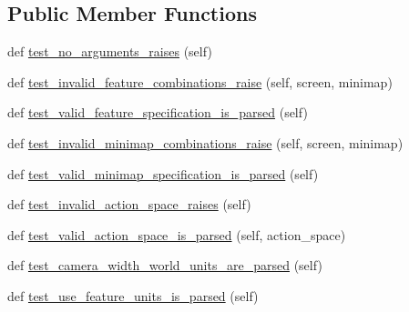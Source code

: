 \subsection*{Public Member Functions}
\begin{DoxyCompactItemize}
\item 
def \mbox{\hyperlink{classpysc2_1_1lib_1_1features__test_1_1_test_parse_agent_interface_format_ab7e830cda6ac5cd5b2b7df2de3d3d987}{test\+\_\+no\+\_\+arguments\+\_\+raises}} (self)
\item 
def \mbox{\hyperlink{classpysc2_1_1lib_1_1features__test_1_1_test_parse_agent_interface_format_a0aac626ffc7c5f1395a73e044b2cbbfe}{test\+\_\+invalid\+\_\+feature\+\_\+combinations\+\_\+raise}} (self, screen, minimap)
\item 
def \mbox{\hyperlink{classpysc2_1_1lib_1_1features__test_1_1_test_parse_agent_interface_format_a0b68ba647c6054b50fce7db1aa1510bf}{test\+\_\+valid\+\_\+feature\+\_\+specification\+\_\+is\+\_\+parsed}} (self)
\item 
def \mbox{\hyperlink{classpysc2_1_1lib_1_1features__test_1_1_test_parse_agent_interface_format_a2f3976383c3c180d453170333b2ebe87}{test\+\_\+invalid\+\_\+minimap\+\_\+combinations\+\_\+raise}} (self, screen, minimap)
\item 
def \mbox{\hyperlink{classpysc2_1_1lib_1_1features__test_1_1_test_parse_agent_interface_format_a9653bf89a6d54bcb364f525432a61a67}{test\+\_\+valid\+\_\+minimap\+\_\+specification\+\_\+is\+\_\+parsed}} (self)
\item 
def \mbox{\hyperlink{classpysc2_1_1lib_1_1features__test_1_1_test_parse_agent_interface_format_ad09fc74c7bdbc03a947d97363e2f9e8b}{test\+\_\+invalid\+\_\+action\+\_\+space\+\_\+raises}} (self)
\item 
def \mbox{\hyperlink{classpysc2_1_1lib_1_1features__test_1_1_test_parse_agent_interface_format_a739eb383d26cc2c5a3a11caf2843ca68}{test\+\_\+valid\+\_\+action\+\_\+space\+\_\+is\+\_\+parsed}} (self, action\+\_\+space)
\item 
def \mbox{\hyperlink{classpysc2_1_1lib_1_1features__test_1_1_test_parse_agent_interface_format_a29240436a6e58284a0ab15c0f8533286}{test\+\_\+camera\+\_\+width\+\_\+world\+\_\+units\+\_\+are\+\_\+parsed}} (self)
\item 
def \mbox{\hyperlink{classpysc2_1_1lib_1_1features__test_1_1_test_parse_agent_interface_format_a097e74a89a782ff9f9922d3e2a5b0d07}{test\+\_\+use\+\_\+feature\+\_\+units\+\_\+is\+\_\+parsed}} (self)
\end{DoxyCompactItemize}


